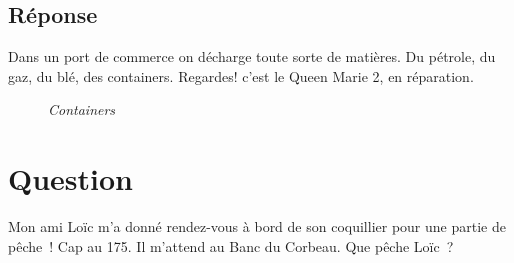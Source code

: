 \documentclass[12pt, report]{article}
\begin{document}
\subsection*{Réponse}
Dans un port de commerce on décharge toute sorte de matières. Du pétrole, du gaz, du blé,  des containers. Regardes!  c'est le Queen Marie 2, en réparation.
\begin{center}
\begin{figure}[ht]
\caption{\textit{Containers}}
\end{figure}
\end{center}

\section{Question}
Mon ami Loïc m’a donné rendez-vous à bord de son coquillier pour une partie de pêche ! Cap au 175. Il m’attend au Banc du Corbeau. Que pêche Loïc ?
\end{document}
